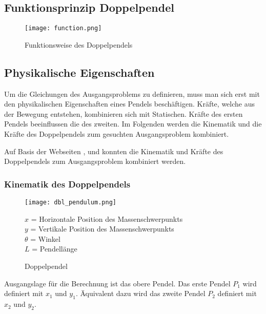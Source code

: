 \documentclass[12pt]{article}
\numberwithin{equation}{subsection}
\begin{document}
\subsection{Funktionsprinzip Doppelpendel}
\begin{figure}[H]
	\centering
	\texttt{[image: function.png]}
	\caption{Funktionsweise des Doppelpendels}
	\label{fig:function}
\end{figure}

\subsection{Physikalische Eigenschaften}
Um die Gleichungen des Ausgangsproblems zu definieren, muss man sich erst mit den physikalischen Eigenschaften eines Pendels beschäftigen. Kräfte, welche aus der Bewegung entstehen, kombinieren sich mit Statischen. Kräfte des ersten Pendels beeinflussen die des zweiten. Im Folgenden werden die Kinematik und die Kräfte des Doppelpendels zum gesuchten Ausgangsproblem kombiniert.

Auf Basis der Webseiten \citep{neumann04}, \citep{kramann11} und \citep{weissstein07} konnten die Kinematik und Kräfte des Doppelpendels zum Ausgangsproblem kombiniert werden. 

\subsubsection{Kinematik des Doppelpendels}
\begin{figure}[H]
	\begin{minipage}[!b]{0.4\textwidth}
		\centering
		\texttt{[image: dbl\_pendulum.png]}
		\caption[Doppelpendel]{Doppelpendel \citep{neumann04}}
		\label{fig:energy}
	\end{minipage}
	\begin{minipage}[!t]{\textwidth}
		\vspace{0pt}\raggedright
		$x$ = Horizontale Position des Massenschwerpunkts\\
		$y$ = Vertikale Position des Massenschwerpunkts\\
		$\theta$ = Winkel\\
		$L$ = Pendellänge
	\end{minipage}
\end{figure}

Ausgangslage für die Berechnung ist das obere Pendel. Das erste Pendel $P_1$ wird definiert mit $x_1$ und $y_1$. Äquivalent dazu wird das zweite Pendel $P_2$ definiert mit $x_2$ und $y_2$.
\end{document}
